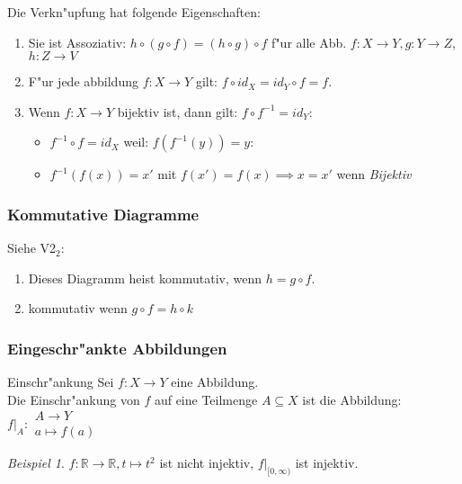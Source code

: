\documentclass[11pt]{article}
\theoremstyle{remark}
\newtheorem{exa}{Beispiel}[section]
\theoremstyle{definition}
\theoremstyle{remark}
\begin{document}
Die Verkn"upfung hat folgende Eigenschaften:
\begin{relation}
\begin{enumerate}
\item Sie ist Assoziativ: \(h\circ (g\circ f) = (h \circ g) \circ f\) f"ur alle Abb. \(f: X\to Y, g:Y\to Z\), \(h:Z\to V\)
\item F"ur jede abbildung \(f: X\to Y\) gilt: \(f\circ id_X=id_Y\circ f = f\).
\item Wenn \(f:X\to Y\) bijektiv ist, dann gilt: \(f\circ f^{-1}=id_Y\):
\begin{itemize}
\item \(f^{-1}\circ f=id_X\) weil: \(f(f^{-1}(y))=y\):
\item \(f^{-1}(f(x))=x'\) mit \(f(x')=f(x)\implies x=x'\) wenn \emph{Bijektiv}
\end{itemize}
\end{enumerate}
\end{relation}

\subsubsection{Kommutative Diagramme}
\label{sec:org429b8d6}
Siehe V2\(_{\text{2}}\): 
\begin{enumerate}
\item Dieses Diagramm heist kommutativ, wenn \(h=g\circ f\).
\item kommutativ wenn \(g\circ f=h\circ k\)
\end{enumerate}

\subsubsection{Eingeschr"ankte Abbildungen}
\label{sec:org60b2559}
\begin{definition}{Einschr"ankung}{}
Sei \(f: X\to Y\) eine Abbildung.\\
Die Einschr"ankung von \(f\) auf eine Teilmenge \(A\subseteq X\) ist die  Abbildung:
\(f|_A:\begin{matrix}A\to Y\\ a\mapsto f(a)\end{matrix}\)
\end{definition}

\begin{exa}
\(f: \mathbb{R}\to \mathbb{R}, t\mapsto t^{2}\) ist nicht injektiv, \(f|_{[0,
\infty)}\) ist injektiv.
\end{exa}
\end{document}
